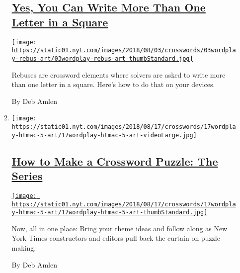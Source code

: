 \begin{enumerate}
\begin{enumerate}
    \hypertarget{yes-you-can-write-more-than-one-letter-in-a-square}{%
    \subsection{\texorpdfstring{\href{/2017/06/01/crosswords/yes-you-can-write-more-than-one-letter-in-a-square.html}{Yes,
    You Can Write More Than One Letter in a
    Square}}{Yes, You Can Write More Than One Letter in a Square}}\label{yes-you-can-write-more-than-one-letter-in-a-square}}

    \href{/2017/06/01/crosswords/yes-you-can-write-more-than-one-letter-in-a-square.html}{\texttt{[image: https://static01.nyt.com/images/2018/08/03/crosswords/03wordplay-rebus-art/03wordplay-rebus-art-thumbStandard.jpg]}}

    Rebuses are crossword elements where solvers are asked to write more
    than one letter in a square. Here's how to do that on your devices.

    By Deb Amlen
  \item
    \texttt{[image: https://static01.nyt.com/images/2018/08/17/crosswords/17wordplay-htmac-5-art/17wordplay-htmac-5-art-videoLarge.jpg]}

    \hypertarget{how-to-make-a-crossword-puzzle-the-series}{%
    \subsection{\texorpdfstring{\href{/2018/09/14/crosswords/how-to-make-a-crossword-puzzle-the-series.html}{How
    to Make a Crossword Puzzle: The
    Series}}{How to Make a Crossword Puzzle: The Series}}\label{how-to-make-a-crossword-puzzle-the-series}}

    \href{/2018/09/14/crosswords/how-to-make-a-crossword-puzzle-the-series.html}{\texttt{[image: https://static01.nyt.com/images/2018/08/17/crosswords/17wordplay-htmac-5-art/17wordplay-htmac-5-art-thumbStandard.jpg]}}

    Now, all in one place: Bring your theme ideas and follow along as
    New York Times constructors and editors pull back the curtain on
    puzzle making.

    By Deb Amlen
  \end{enumerate}
\end{enumerate}

